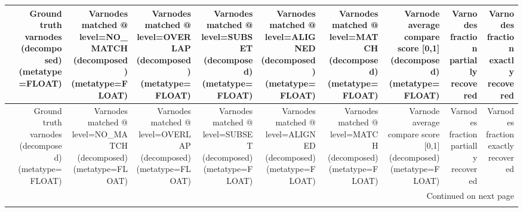 \begin{longtable}{lrrrrrrrrr}
\toprule
{} &  Ground truth varnodes (decomposed) (metatype=FLOAT) &  Varnodes matched @ level=NO\_MATCH (decomposed) (metatype=FLOAT) &  Varnodes matched @ level=OVERLAP (decomposed) (metatype=FLOAT) &  Varnodes matched @ level=SUBSET (decomposed) (metatype=FLOAT) &  Varnodes matched @ level=ALIGNED (decomposed) (metatype=FLOAT) &  Varnodes matched @ level=MATCH (decomposed) (metatype=FLOAT) &  Varnode average compare score {[}0,1] (decomposed) (metatype=FLOAT) &  Varnodes fraction partially recovered &  Varnodes fraction exactly recovered \\
\midrule
\endfirsthead

\toprule
{} &  Ground truth varnodes (decomposed) (metatype=FLOAT) &  Varnodes matched @ level=NO\_MATCH (decomposed) (metatype=FLOAT) &  Varnodes matched @ level=OVERLAP (decomposed) (metatype=FLOAT) &  Varnodes matched @ level=SUBSET (decomposed) (metatype=FLOAT) &  Varnodes matched @ level=ALIGNED (decomposed) (metatype=FLOAT) &  Varnodes matched @ level=MATCH (decomposed) (metatype=FLOAT) &  Varnode average compare score {[}0,1] (decomposed) (metatype=FLOAT) &  Varnodes fraction partially recovered &  Varnodes fraction exactly recovered \\
\midrule
\endhead
\midrule
\multicolumn{10}{r}{{Continued on next page}} \\
\midrule
\endfoot


\end{longtable}
